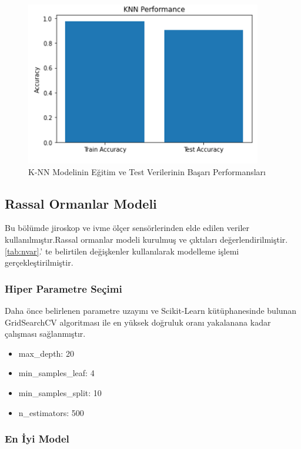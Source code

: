 \documentclass[12pt,twoside]{deuthesis}
\providecommand{\tightlist}{%
  \setlength{\itemsep}{0pt}\setlength{\parskip}{0pt}}
\begin{document}
\begin{figure}

{\centering \includegraphics[width=0.6\linewidth,height=0.25\textheight]{figure/jiknn_testtrain} 

}

\caption{K-NN Modelinin Eğitim ve Test Verilerinin Başarı Performansları}\label{fig:jiknntesttrain}
\end{figure}
\hypertarget{rassal-ormanlar-modeli-2}{%
\subsection{Rassal Ormanlar Modeli}\label{rassal-ormanlar-modeli-2}}

Bu bölümde jiroskop ve ivme ölçer sensörlerinden elde edilen veriler kullanılmıştır.Rassal ormanlar modeli kurulmuş ve çıktıları değerlendirilmiştir. \ref{tab:nvar}.' te belirtilen değişkenler kullanılarak modelleme işlemi gerçekleştirilmiştir.

\hypertarget{hiper-parametre-seuxe7imi-9}{%
\subsubsection{Hiper Parametre Seçimi}\label{hiper-parametre-seuxe7imi-9}}

Daha önce belirlenen parametre uzayını ve Scikit-Learn kütüphanesinde bulunan GridSearchCV algoritması ile en yüksek doğruluk oranı yakalanana kadar çalışması sağlanmıştır.
\begin{itemize}
\tightlist
\item
  max\_depth: 20
\item
  min\_samples\_leaf: 4
\item
  min\_samples\_split: 10
\item
  n\_estimators: 500
\end{itemize}
\hypertarget{en-iyi-model-11}{%
\subsubsection{En İyi Model}\label{en-iyi-model-11}}
\end{document}
